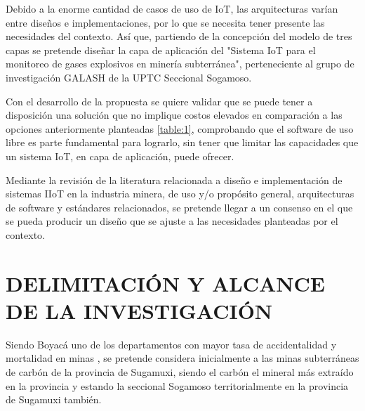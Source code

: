 \documentclass[stu,12pt,floatsintext]{apa7}
\begin{document}
		 Debido a la enorme cantidad de casos de uso de IoT, las arquitecturas varían entre diseños e implementaciones, por lo que se necesita tener presente las necesidades del contexto. Así que, partiendo de la concepción del modelo de tres capas\cite{10.1007/978-981-16-5655-2_3} se pretende diseñar la capa de aplicación del "Sistema IoT para el monitoreo de gases explosivos en minería subterránea", perteneciente al grupo de investigación GALASH de la UPTC Seccional Sogamoso.
		
		Con el desarrollo de la propuesta se quiere validar que se puede tener a disposición una solución que no implique costos elevados en comparación a las opciones anteriormente planteadas \ref{table:1}, comprobando que el software de uso libre es parte fundamental para lograrlo, sin tener que limitar las capacidades que un sistema IoT, en capa de aplicación, puede ofrecer.
	
		Mediante la revisión de la literatura relacionada a diseño e implementación de sistemas IIoT en la industria minera, de uso y/o propósito general, arquitecturas de software y estándares relacionados, se pretende llegar a un consenso en el que se pueda producir un diseño que se ajuste a las necesidades planteadas por el contexto.
		
	\section{DELIMITACIÓN Y ALCANCE DE LA INVESTIGACIÓN}
	Siendo Boyacá uno de los departamentos con mayor tasa de accidentalidad y mortalidad en minas \cite{anm2020}, se pretende considera inicialmente a las minas subterráneas de carbón de la provincia de Sugamuxi, siendo el carbón el mineral más extraído en la provincia y estando la seccional Sogamoso territorialmente en la provincia de Sugamuxi también.
	
\end{document}
